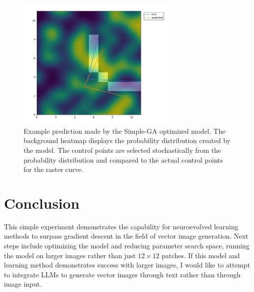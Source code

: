 \documentclass{article}
\begin{document}
\begin{figure}[!ht]
\centering
\includegraphics[width=0.7\textwidth]{sga-pred.png}
\caption{Example prediction made by the Simple-GA optimized model. The background heatmap displays the probability distribution created by the model. The control points are selected stochastically from the probability distribution and compared to the actual control points for the raster curve.}
\end{figure}

\section{Conclusion}

This simple experiment demonstrates the capability for neuroevolved learning methods to surpass gradient descent in the field of vector image generation. Next steps include optimizing the model and reducing parameter search space, running the model on larger images rather than just $12\times12$ patches. If this model and learning method demonstrates success with larger images, I would like to attempt to integrate LLMs to generate vector images through text rather than through image input.

\medskip

\printbibliography
\end{document}
